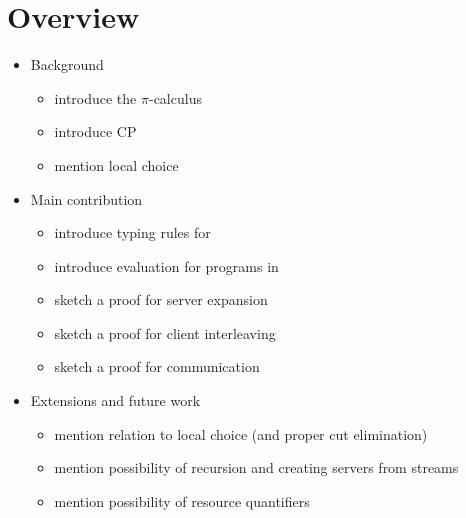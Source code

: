 \documentclass[a4paper,UKenglish]{lipics-v2016}
\begin{document}
\section{Overview}
\begin{itemize}
\item Background
  \begin{itemize}
  \item introduce the $\pi$-calculus
  \item introduce CP
  \item mention local choice
  \end{itemize}
\item Main contribution
  \begin{itemize}
  \item introduce typing rules for \nodcap
  \item introduce evaluation for programs in \nodcap
  \item sketch a proof for server expansion
  \item sketch a proof for client interleaving
  \item sketch a proof for communication
  \end{itemize}
\item Extensions and future work
  \begin{itemize}
  \item mention relation to local choice (and proper cut elimination)
  \item mention possibility of recursion and creating servers from streams
  \item mention possibility of resource quantifiers
  \end{itemize} 
\end{itemize}
\end{document}
